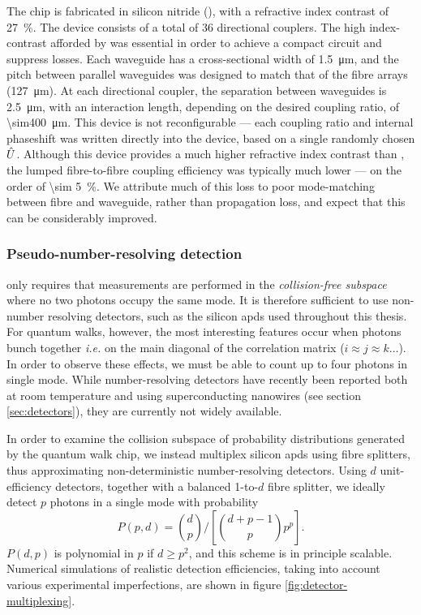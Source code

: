 The chip is fabricated in silicon nitride (\sini), with a refractive index contrast of \SI{27}{\percent}. The device consists of a total of 36 directional couplers. The high index-contrast afforded by \sini was essential in order to achieve a compact circuit and suppress losses. Each waveguide has a cross-sectional width of \SI{1.5}{\micro\metre}, and the pitch between parallel waveguides was designed to match that of the fibre arrays (\SI{127}{\micro\metre}). At each directional coupler, the separation between waveguides is \SI{2.5}{\micro\metre}, with an interaction length, depending on the desired coupling ratio, of \SI{\sim400}{\micro\metre}. This device is not reconfigurable --- each coupling ratio and internal phaseshift was written directly into the device, based on a single randomly chosen $\hat{U}$.
Although this device provides a much higher refractive index contrast than \sion, the lumped fibre-to-fibre coupling efficiency was typically much lower --- on the order of \SI{\sim 5}{\percent}. We attribute much of this loss to poor mode-matching between fibre and waveguide, rather than propagation loss, and expect that this can be considerably improved.

\subsubsection{Pseudo-number-resolving detection} 
\label{sec:detection-scheme}
\bosonsampling only requires that measurements are performed in the \emph{collision-free subspace} where no two photons occupy the same mode. It is therefore sufficient to use non-number resolving detectors, such as the silicon \glspl{apd} used throughout this thesis.  For quantum walks, however, the most interesting features occur when photons bunch together \emph{i.e.} on the main diagonal of the correlation matrix ($i\approx j \approx k \ldots$). In order to observe these effects, we must be able to count up to four photons in single mode. While number-resolving detectors have recently been reported both at room temperature and using superconducting nanowires (see section \ref{sec:detectors}), they are currently not widely available. 

In order to examine the collision subspace of probability distributions generated by the quantum walk chip, we instead multiplex silicon \glspl{apd} using fibre splitters, thus approximating non-deterministic number-resolving detectors. Using $d$ unit-efficiency detectors, together with a balanced 1-to-$d$ fibre splitter, we ideally detect $p$ photons in a single mode with probability 
\begin{equation}
    P(p,d) = {\binom{d}{p}}/\left[\binom{d+p-1}{p} p^p\right].
\end{equation} 
$P(d,p)$ is polynomial in $p$ if $d\ge p^2$, and this scheme is in principle scalable.
Numerical simulations of realistic detection efficiencies, taking into account various experimental imperfections, are shown in figure \ref{fig:detector-multiplexing}.

